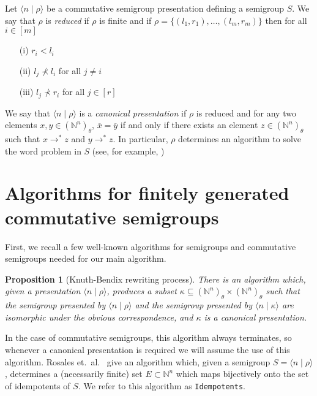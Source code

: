 \documentclass[12pt]{article}
\def\N{{\mathbb{N}}}
\newtheorem{proposition}{\qquad\bf Proposition}
\begin{document}
Let $\langle n\mid\rho\rangle$ be a 
commutative semigroup presentation defining a semigroup $S$.
We say that $\rho$ is \emph{reduced} if $\rho$ is finite and if
$\rho=\{(l_1,r_1),\ldots,(l_m,r_m)\}$ 
then for all $i\in [m]$
\begin{itemize}
\item[(i)]
$r_i<l_i$
\item[(ii)]
$l_j\nprec l_i$ for all $j\neq i$
\item[(iii)]
$l_j\nprec r_i$ for all $j\in[r]$
\end{itemize} 
We say that $\langle n\mid\rho\rangle$ is a \emph{canonical presentation} 
if $\rho$ is reduced and for any two elements
$x,y\in(\mathbb{N}^n)_{\theta}$, $\overline{x}=\overline{y}$ if and 
only if there exists an element $z\in(\mathbb{N}^n)_{\theta}$ such
that $x\rightarrow^*z$ and $y\rightarrow^*z$.
In particular, $\rho$ determines an algorithm to solve the word
problem in $S$ (see, for example, \cite{bRG99})

\section{Algorithms for finitely generated commutative semigroups}

First, we recall a few well-known algorithms for semigroups 
and commutative semigroups needed for our main algorithm. 

\begin{proposition}[Knuth-Bendix rewriting process]
There is an algorithm which, given a presentation  
$\langle n  \mid \rho \rangle$,
produces a  subset $\kappa \subseteq 
(\N^n)_\theta \times (\N^n)_\theta$ such that 
the semigroup presented by $\langle n  \mid \rho \rangle$ and
the semigroup presented by $\langle n  \mid \kappa \rangle$ 
are isomorphic under the obvious correspondence,
and $\kappa$ is a canonical presentation.
\end{proposition}

In the case of commutative semigroups, this algorithm always terminates, 
so whenever a canonical presentation is required we will assume the use
of this algorithm. Rosales et.~al.~\cite{pRGG99} give an 
algorithm  which, given a semigroup $S = \langle n \mid \rho \rangle$, 
determines a (necessarily finite) set $E \subset \mathbb{N}^n$ which 
maps bijectively onto the set of idempotents of $S$. 
We refer to this algorithm as {\tt Idempotents}.

\end{document}
